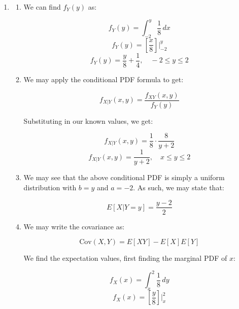 \begin{enumerate}
\begin{enumerate}
        We then solve:

        $$f_{X|A}(x)=\frac{2xy+y^2}{20}\Big|_0^4$$
        $$\boxed{f_{X|A}(x)=\frac{2x+4}{5},\quad 0\leq x\leq 1}$$

        $$f_{Y|A}(y)=\frac{x^2+2xy}{20}\Big|_0^1$$
        $$\boxed{f_{Y|A}(y)=\frac{1+2y}{20},\quad 0\leq y\leq 4}$$

        We can then use the first result to find:

        $$E[X|A]=\int_0^1 x\left( \frac{2x+4}{5} \right)\,dx$$
        $$E[X|A]=\int_0^1 \frac{2x^2+4x}{5} \right)\,dx$$
        $$E[X|A]=\frac{2x^3+6x^2}{15} \Big|_0^1$$
        $$\boxed{E[X|A]=\frac{8}{15}}$$

    \end{enumerate}

    \setcounter{enumi}{5}

  \item

    \begin{enumerate}

      \item We can find $f_Y(y)$ as:

        $$f_Y(y)=\int_{-2}^y \frac{1}{8}\,dx$$
        $$f_Y(y)=\left[\frac{x}{8}\right]\Big|_{-2}^y$$
        $$\boxed{f_Y(y)=\frac{y}{8}+\frac{1}{4},\quad -2\leq y\leq 2}$$

      \item We may apply the conditional PDF formula to get:

        $$f_{X|Y}(x,y)=\frac{f_{XY}(x,y)}{f_Y(y)}$$

        Substituting in our known values, we get:

        $$f_{X|Y}(x,y)=\frac{1}{8}\cdot\frac{8}{y+2}$$
        $$\boxed{f_{X|Y}(x,y)=\frac{1}{y+2},\quad x\leq y\leq 2}$$

      \item We may see that the above conditional PDF is simply a uniform distribution with $b=y$ and $a=-2$. As such, we may state that:

        $$\boxed{E[X|Y=y]=\frac{y-2}{2}}$$

      \item We may write the covariance as:

        $$\text{Cov}(X,Y)=E[XY]-E[X]E[Y]$$

        We find the expectation values, first finding the marginal PDF of $x$:

        $$f_X(x)=\int_x^2 \frac{1}{8}\,dy$$
        $$f_X(x)=\left[\frac{y}{8}\right]\Big|_x^2$$


\end{enumerate}
\end{enumerate}
